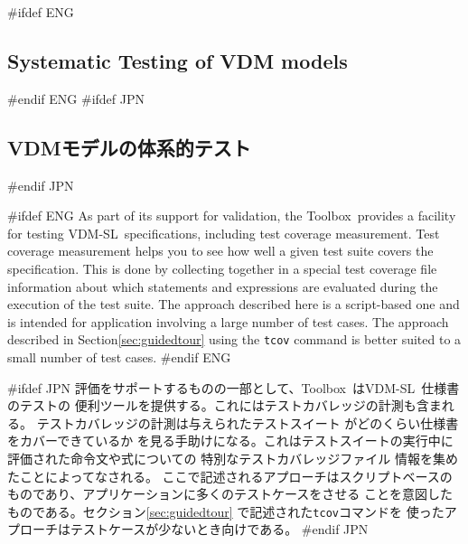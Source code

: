 \documentclass[\pformat,12pt]{article}
\newcommand{\vdmslpp}{VDM-SL}
\newcommand{\Toolbox}{Toolbox}
\newcommand{\vdmslpp}{VDM++}
\newcommand{\Toolbox}{Toolbox}
\begin{document}
\newpage
#ifdef ENG
\subsection{Systematic Testing of VDM models}\label{sec:testing}
\label{vdmtc} 
#endif ENG
#ifdef JPN
\subsection{VDMモデルの体系的テスト}\label{sec:testing}
\label{vdmtc} 
#endif JPN

#ifdef ENG
As part of its support for validation, the \Toolbox\ provides a
facility for testing \vdmslpp\ specifications, including test
  coverage measurement.  Test coverage measurement helps you to see
how well a given test suite covers the
specification. This is done by collecting together in a special 
test coverage file information  about which
statements and expressions are 
evaluated during the execution of the test suite. The approach
described here is a script-based one and is intended for application
involving a large number of test cases. The approach described in
Section\ref{sec:guidedtour} using the \texttt{tcov} command is better
suited to a small number of test cases.
#endif ENG

#ifdef JPN
評価をサポートするものの一部として、\Toolbox\ は\vdmslpp\ 仕様書のテストの
便利ツールを提供する。これにはテストカバレッジの計測も含まれる。
テストカバレッジの計測は与えられたテストスイート
 がどのくらい仕様書をカバーできているか
を見る手助けになる。これはテストスイートの実行中に評価された命令文や式についての
特別なテストカバレッジファイル 情報を集めたことによってなされる。
ここで記述されるアプローチはスクリプトベースのものであり、アプリケーションに多くのテストケースをさせる
ことを意図したものである。セクション\ref{sec:guidedtour} で記述された\texttt{tcov}コマンドを
使ったアプローチはテストケースが少ないとき向けである。
#endif JPN
\end{document}
